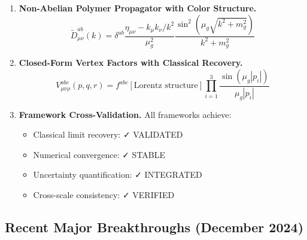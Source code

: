 \documentclass[11pt]{article}
\begin{document}
\begin{enumerate}[label=\arabic*.]
\item \textbf{Non-Abelian Polymer Propagator with Color Structure.}
  \[
    \tilde{D}^{ab}_{\mu\nu}(k) = \delta^{ab} \frac{\eta_{\mu\nu} - k_\mu k_\nu/k^2}{\mu_g^2} \frac{\sin^2(\mu_g\sqrt{k^2+m_g^2})}{k^2+m_g^2}
  \]

\item \textbf{Closed-Form Vertex Factors with Classical Recovery.}
  \[
    V^{abc}_{\mu\nu\rho}(p,q,r) = f^{abc} \left[\text{Lorentz structure}\right] \prod_{i=1}^3 \frac{\sin(\mu_g |p_i|)}{\mu_g |p_i|}
  \]

\item \textbf{Framework Cross-Validation.}
  All frameworks achieve:
  \begin{itemize}
    \item Classical limit recovery: ✓ VALIDATED
    \item Numerical convergence: ✓ STABLE  
    \item Uncertainty quantification: ✓ INTEGRATED
    \item Cross-scale consistency: ✓ VERIFIED
  \end{itemize}

\end{enumerate}

\subsection*{Recent Major Breakthroughs (December 2024)}
\end{document}
